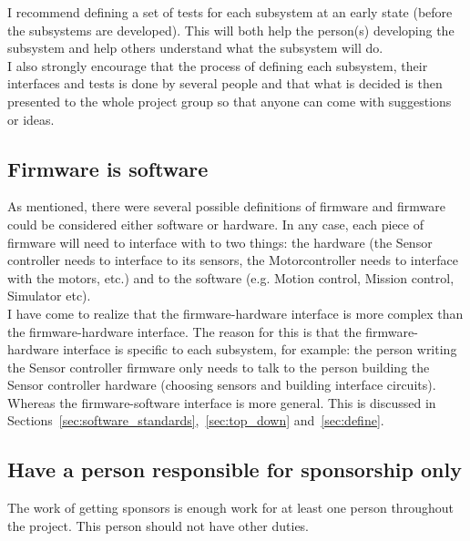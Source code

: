 I recommend defining a set of tests for each subsystem at an early state (before the subsystems are developed). This will both help the person(s) developing the subsystem and help others understand what the subsystem will do. \\
I also strongly encourage that the process of defining each subsystem, their interfaces and tests is done by several people and that what is decided is then presented to the whole project group so that anyone can come with suggestions or ideas.


\subsection{Firmware is software}\label{sec:firmware}
As mentioned, there were several possible definitions of firmware and firmware could be considered either software or hardware. %
In any case, each piece of firmware will need to interface with to two things: the hardware (the Sensor controller needs to interface to its sensors, the Motorcontroller needs to interface with the motors, etc.) and to the software (e.g. Motion control, Mission control, Simulator etc). \\
I have come to realize that the firmware-hardware interface is more complex than the firmware-hardware interface. The reason for this is that the firmware-hardware interface is specific to each subsystem, for example: the person writing the Sensor controller firmware only needs to talk to the person building the Sensor controller hardware (choosing sensors and building interface circuits). Whereas the firmware-software interface is more general. This is discussed in Sections~\ref{sec:software_standards},~\ref{sec:top_down} and~\ref{sec:define}.


\subsection{Have a person responsible for sponsorship only}
The work of getting sponsors is enough work for at least one person throughout the project. This person should not have other duties.

